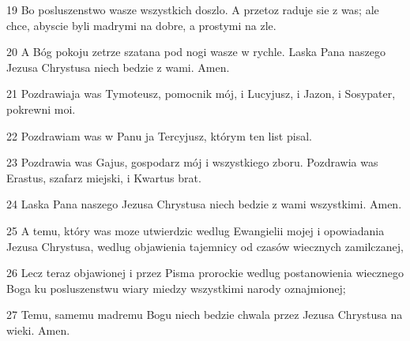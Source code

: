 \par 19 Bo posluszenstwo wasze wszystkich doszlo. A przetoz raduje sie z was; ale chce, abyscie byli madrymi na dobre, a prostymi na zle.
\par 20 A Bóg pokoju zetrze szatana pod nogi wasze w rychle. Laska Pana naszego Jezusa Chrystusa niech bedzie z wami. Amen.
\par 21 Pozdrawiaja was Tymoteusz, pomocnik mój, i Lucyjusz, i Jazon, i Sosypater, pokrewni moi.
\par 22 Pozdrawiam was w Panu ja Tercyjusz, którym ten list pisal.
\par 23 Pozdrawia was Gajus, gospodarz mój i wszystkiego zboru. Pozdrawia was Erastus, szafarz miejski, i Kwartus brat.
\par 24 Laska Pana naszego Jezusa Chrystusa niech bedzie z wami wszystkimi. Amen.
\par 25 A temu, który was moze utwierdzic wedlug Ewangielii mojej i opowiadania Jezusa Chrystusa, wedlug objawienia tajemnicy od czasów wiecznych zamilczanej,
\par 26 Lecz teraz objawionej i przez Pisma prorockie wedlug postanowienia wiecznego Boga ku posluszenstwu wiary miedzy wszystkimi narody oznajmionej;
\par 27 Temu, samemu madremu Bogu niech bedzie chwala przez Jezusa Chrystusa na wieki. Amen.


